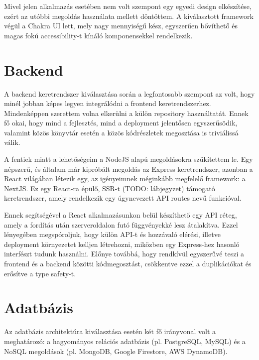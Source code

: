 Mivel jelen alkalmazás esetében nem volt szempont egy egyedi design elkészítése, ezért az utóbbi megoldás használata mellett döntöttem.
A kiválasztott framework végül a Chakra UI lett, mely nagy mennyiségű kész, egyszerűen bővíthető és magas fokú accessibility-t kínáló komponensekkel rendelkezik.

\section{Backend}
A backend keretrendszer kiválasztása során a legfontosabb szempont az volt, hogy minél jobban képes legyen integrálódni a frontend keretrendszerhez.
Mindenképpen szerettem volna elkerülni a külön repository használtatát.
Ennek fő okai, hogy mind a fejlesztés, mind a deployment jelentősen egyszerűsödik, valamint közös könyvtár esetén a közös kódrészletek megosztása is triviálissá válik.

A fentiek miatt a lehetőségeim a NodeJS alapú megoldásokra szűkítettem le. Egy népszerű, és általam már kipróbált megoldás az Express keretrendszer, azonban a React világában létezik egy, az igényeimnek méginkább megfelelő framework: a NextJS.
Ez egy React-ra épülő, SSR-t (TODO: lábjegyzet) támogató keretrendszer, amely rendelkezik egy úgynevezett API routes nevű funkcióval.

Ennek segítségével a React alkalmazásunkon belül készíthető egy API réteg, amely a fordítás után szerveroldalon futó függvényekké lesz átalakítva.
Ezzel lényegében megspóroljuk, hogy külön API-t és hozzávaló elérési, illetve deployment környezetet kelljen létrehozni, miközben egy Express-hez hasonló interfészt tudunk használni.
Előnye továbbá, hogy rendkívül egyszerűvé teszi a frontend és a backend közötti kódmegosztást, csökkentve ezzel a duplikációkat és erősítve a type safety-t.

\section{Adatbázis}
Az adatbázis architektúra kiválasztása esetén két fő irányvonal volt a meghatározó: a hagyományos relációs adatbázis (pl. PostgreSQL, MySQL) és a NoSQL megoldások (pl. MongoDB, Google Firestore, AWS DynamoDB).

